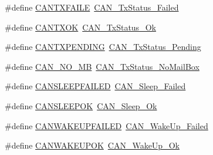 \begin{DoxyCompactItemize}
\item 
\#define \hyperlink{group___c_a_n___legacy_gae315f7ee14af20ca8454be9e507873cd}{C\+A\+N\+T\+X\+F\+A\+I\+LE}~\hyperlink{group___c_a_n__transmit__constants_ga8d193002e76c04ec8caff6b110cd5983}{C\+A\+N\+\_\+\+Tx\+Status\+\_\+\+Failed}
\item 
\#define \hyperlink{group___c_a_n___legacy_ga288ba42cf1de7572f2fe1378268c9452}{C\+A\+N\+T\+X\+OK}~\hyperlink{group___c_a_n__transmit__constants_ga0b401c61922b1449de9b486dcf475c97}{C\+A\+N\+\_\+\+Tx\+Status\+\_\+\+Ok}
\item 
\#define \hyperlink{group___c_a_n___legacy_ga76f43f4c54505b1f87b39b056ca38897}{C\+A\+N\+T\+X\+P\+E\+N\+D\+I\+NG}~\hyperlink{group___c_a_n__transmit__constants_ga9678a3a51379422868083608c7394409}{C\+A\+N\+\_\+\+Tx\+Status\+\_\+\+Pending}
\item 
\#define \hyperlink{group___c_a_n___legacy_ga418f1fd7ca2e852b263fd07874fde0c6}{C\+A\+N\+\_\+\+N\+O\+\_\+\+MB}~\hyperlink{group___c_a_n__transmit__constants_ga2620e99debd51011d3569121f2e44690}{C\+A\+N\+\_\+\+Tx\+Status\+\_\+\+No\+Mail\+Box}
\item 
\#define \hyperlink{group___c_a_n___legacy_ga4d5e8e0c57febb024b30e5f24866a117}{C\+A\+N\+S\+L\+E\+E\+P\+F\+A\+I\+L\+ED}~\hyperlink{group___c_a_n__sleep__constants_ga169500ab7169c4e9c7e9e4ea34b3e070}{C\+A\+N\+\_\+\+Sleep\+\_\+\+Failed}
\item 
\#define \hyperlink{group___c_a_n___legacy_ga2f8d34f8f60a6c84d8e436d4d37708ab}{C\+A\+N\+S\+L\+E\+E\+P\+OK}~\hyperlink{group___c_a_n__sleep__constants_gaf5c4e9d32d4faff9d0bf61e153ed7998}{C\+A\+N\+\_\+\+Sleep\+\_\+\+Ok}
\item 
\#define \hyperlink{group___c_a_n___legacy_ga0de3b0e2c544d9fa772b646e331e51b1}{C\+A\+N\+W\+A\+K\+E\+U\+P\+F\+A\+I\+L\+ED}~\hyperlink{group___c_a_n__wake__up__constants_ga837fd7ad47fee78e43a186544e2b390b}{C\+A\+N\+\_\+\+Wake\+Up\+\_\+\+Failed}
\item 
\#define \hyperlink{group___c_a_n___legacy_gafed6ab4dbb00c9d63f6a7cdf323f33ef}{C\+A\+N\+W\+A\+K\+E\+U\+P\+OK}~\hyperlink{group___c_a_n__wake__up__constants_ga152e4935cf85bdfb803eb36b656cd690}{C\+A\+N\+\_\+\+Wake\+Up\+\_\+\+Ok}
\end{DoxyCompactItemize}
